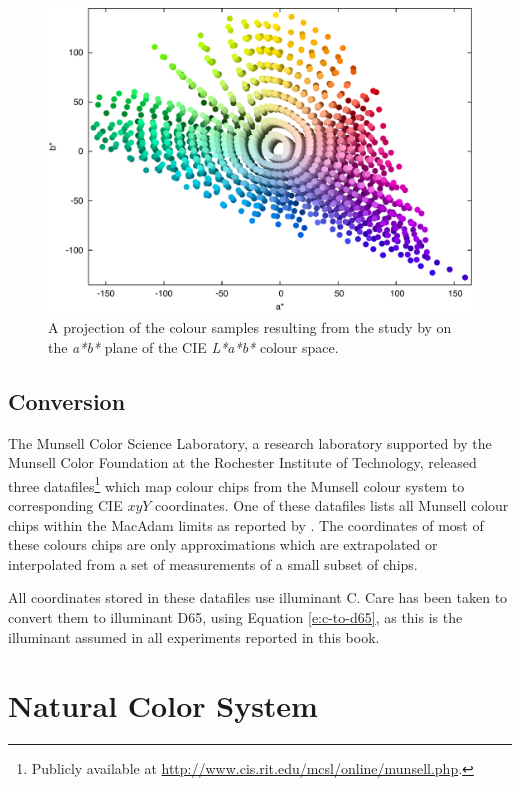 \begin{figure}[htbp]
\begin{center}
\includegraphics[width=.85\textwidth]{./spaces/figures/real.pdf}
\caption[Colour samples resulting from a study by
\citeauthor{newhall42final}]{A projection of the colour samples
  resulting from the study by \citeauthor{newhall42final} on the
  \emph{a*b*} plane of the CIE \emph{L*a*b*} colour space.}
\label{f:munsell}
\end{center}
\end{figure}

\subsection{Conversion}

The Munsell Color Science Laboratory, a research laboratory supported
by the Munsell Color Foundation at the Rochester Institute of
Technology, released three datafiles\footnote{Publicly available at
  \url{http://www.cis.rit.edu/mcsl/online/munsell.php}.} which map
colour chips from the Munsell colour system to corresponding CIE $xyY$
coordinates. One of these datafiles lists all Munsell colour chips
within the MacAdam limits as reported by \citet{newhall42final}. The
coordinates of most of these colours chips are only approximations
which are extrapolated or interpolated from a set of measurements of a
small subset of chips.

All coordinates stored in these datafiles use illuminant C. Care has
been taken to convert them to illuminant D65, using Equation
\ref{e:c-to-d65}, as this is the illuminant assumed in all experiments
reported in this book.

\section{Natural Color System}
\label{s:NCS}

